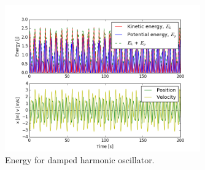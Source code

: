 \documentclass{article}
\begin{document}
\begin{figure}[H]
\centering
\includegraphics[width=0.75\textwidth]{problem_3_2}
\caption{Energy for damped harmonic oscillator.}
\label{fig:problem_b_contour_fig}
\end{figure}
\end{document}
